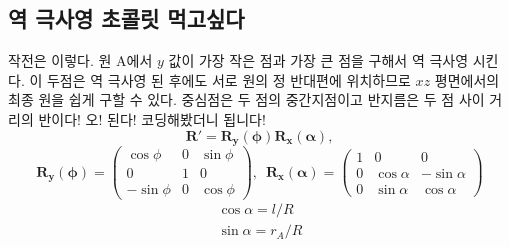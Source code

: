 \documentclass[chapter,a4paper,10pt]{oblivoir}
\begin{document}
\subsection{역 극사영 초콜릿 먹고싶다}
작전은 이렇다. 원 A에서 $y$ 값이 가장 작은 점과 가장 큰 점을 구해서 역 극사영 시킨다.
이 두점은 역 극사영 된 후에도 서로 원의 정 반대편에 위치하므로 
$xz$ 평면에서의 최종 원을 쉽게 구할 수 있다.
중심점은 두 점의 중간지점이고 반지름은 두 점 사이 거리의 반이다!
오! 된다! 코딩해봤더니 됩니다!
\begin{equation}
\mathbf{R}' = \mathbf{R_y(\phi)}\mathbf{R_x(\alpha)},
\end{equation}
\begin{equation}
\mathbf{R_y(\phi)} = \left( \begin{array}{ccc}
  \cos \phi & 0 & \sin \phi \\
  0 & 1 & 0 \\
  -\sin \phi & 0 & \cos \phi
\end{array} \right) ,\,\,\,
\mathbf{R_x(\alpha)} = \left( \begin{array}{ccc}
  1 & 0 & 0 \\
  0 & \cos \alpha & -\sin \alpha \\
  0 & \sin \alpha & \cos \alpha
\end{array} \right)
\end{equation}
\begin{equation}
\left. \begin{array}{ll}
\cos \alpha = {l}/{R} \\
\sin \alpha = {r_A}/{R}
\end{array}\right.
\end{equation}
\end{document}
